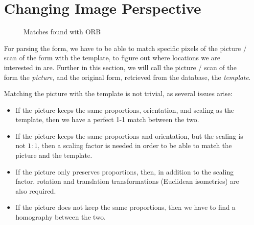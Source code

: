 \documentclass[11pt, a4paper]{report}
\begin{document}
\section{Changing Image Perspective}


 \begin{figure}[!h]
     \centering
     \caption{Matches found with ORB}
     \label{orb-matches}
 \end{figure}

For parsing the form, we have to be able to match specific pixels of the picture / scan of the form with the template, to figure out where locations we are interested in are. Further in this section, we will call the picture / scan of the form the \textit{picture}, and the original form, retrieved from the database, the \textit{template}.

Matching the picture with the template is not trivial, as several issues arise:
\begin{itemize}
    \item If the picture keeps the same proportions, orientation, and scaling as the template, then we have a perfect 1-1 match between the two.
    \item If the picture keeps the same proportions and orientation, but the scaling is not $1:1$, then a scaling factor is needed in order to be able to match the picture and the template.
    \item If the picture only preserves proportions, then, in addition to the scaling factor,  rotation and translation transformations (Euclidean isometries) are also required.
    \item If the picture does not keep the same proportions, then we have to find a homography between the two.
\end{itemize}
\end{document}
